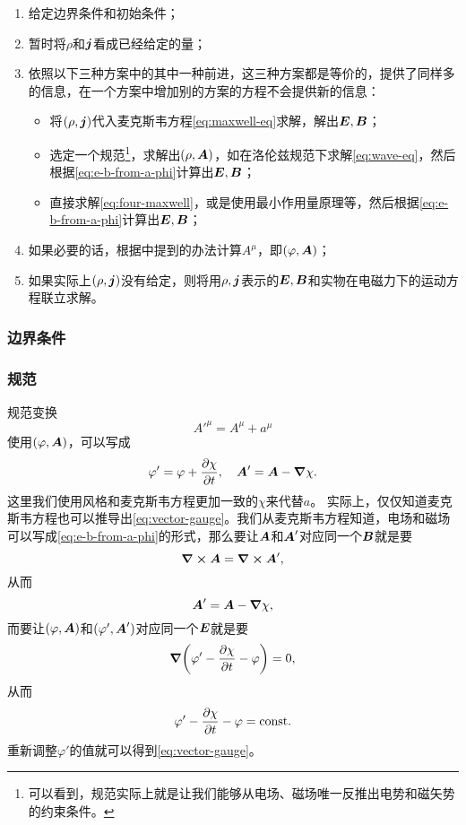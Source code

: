 \documentclass[UTF8, a4paper]{ctexart}
\newcommand*{\const}{\mathrm{const}}
\begin{document}
\begin{enumerate}
    \item 给定边界条件和初始条件；
    \item 暂时将$\rho$和$\vb*{j}$看成已经给定的量；
    \item 依照以下三种方案中的其中一种前进，这三种方案都是等价的，提供了同样多的信息，在一个方案中增加别的方案的方程不会提供新的信息：
    \begin{itemize}
        \item 将$(\rho, \vb*{j})$代入麦克斯韦方程\eqref{eq:maxwell-eq}求解，解出$\vb*{E}, \vb*{B}$；
        \item 选定一个规范\footnote{可以看到，规范实际上就是让我们能够从电场、磁场唯一反推出电势和磁矢势的约束条件。}，求解出$(\rho, \vb*{A})$，如在洛伦兹规范下求解\eqref{eq:wave-eq}，然后根据\eqref{eq:e-b-from-a-phi}计算出$\vb*{E}, \vb*{B}$；
        \item 直接求解\eqref{eq:four-maxwell}，或是使用最小作用量原理等，然后根据\eqref{eq:e-b-from-a-phi}计算出$\vb*{E}, \vb*{B}$；
    \end{itemize}
    \item 如果必要的话，根据中提到的办法计算$A^\mu$，即$(\varphi, \vb*{A})$；
    \item 如果实际上$(\rho, \vb*{j})$没有给定，则将用$\rho, \vb*{j}$表示的$\vb*{E}, \vb*{B}$和实物在电磁力下的运动方程联立求解。
\end{enumerate}

\subsubsection{边界条件}\label{sec:boundary}

\subsubsection{规范}

规范变换
\[
    A'^\mu = A^\mu + a^\mu
\]
使用$(\varphi, \vb*{A})$，可以写成
\begin{equation}
    \varphi' = \varphi + \pdv{\chi}{t}, \quad \vb*{A}' = \vb*{A} - \grad{\chi}.    
    \label{eq:vector-gauge}
\end{equation}
这里我们使用风格和麦克斯韦方程更加一致的$\chi$来代替$a$。
实际上，仅仅知道麦克斯韦方程也可以推导出\eqref{eq:vector-gauge}。我们从麦克斯韦方程知道，电场和磁场可以写成\eqref{eq:e-b-from-a-phi}的形式，那么要让$\vb*{A}$和$\vb*{A}'$对应同一个$\vb*{B}$就是要
\[
    \curl{\vb*{A}} = \curl{\vb*{A}'},
\]
从而
\[
    \vb*{A}' = \vb*{A} - \grad{\chi},
\]
而要让$(\varphi, \vb*{A})$和$(\varphi', \vb*{A}')$对应同一个$\vb*{E}$就是要
\[
    \grad(\varphi' - \pdv{\chi}{t} - \varphi) = 0,
\]
从而
\[
    \varphi' - \pdv{\chi}{t} - \varphi = \const.
\]
重新调整$\varphi'$的值就可以得到\eqref{eq:vector-gauge}。
\end{document}
